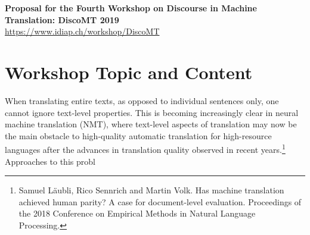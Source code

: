 \documentclass[11pt]{article}
\begin{document}
\begin{center}
\Large{\textbf{Proposal for the Fourth Workshop on Discourse in Machine Translation: DiscoMT 2019}}\\
\url{https://www.idiap.ch/workshop/DiscoMT}
\end{center}



\section{Workshop Topic and Content}




When translating entire texts, as opposed to individual sentences only, 
one cannot ignore text-level properties. This is becoming increasingly
clear in neural machine translation (NMT), where text-level aspects of
translation may now be the main obstacle to high-quality automatic
translation for high-resource languages after the advances in translation
quality observed in recent years.\footnote{Samuel Läubli, Rico Sennrich
and Martin Volk. Has machine translation achieved human parity? A case
for document-level evaluation. Proceedings of the 2018 Conference on
Empirical Methods in Natural Language Processing.} Approaches to this
probl
\end{document}

